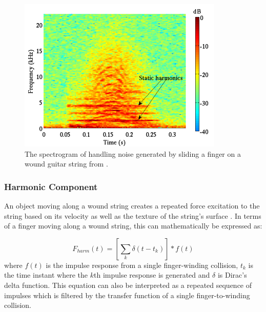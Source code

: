 \documentclass[main.tex]{subfiles}
\begin{document}
\begin{figure}[h]
    \centering
    \includegraphics[scale=1]{./images/pictures/finger-noise-spectrogram.png}
    \caption{The spectrogram of handling noise generated by sliding a finger on a wound guitar string from .}
    \label{fig:finger_noise_spectrogram}
\end{figure}

\subsubsection{Harmonic Component}
An object moving along a wound string creates a repeated force excitation to the string based on its velocity as well as the texture of the string's surface . In terms of a finger moving along a wound string, this can mathematically be expressed as:

\begin{equation}
    F_{harm}(t) = \left[\sum_k \delta(t-t_k)\right] \ast f(t)
    \label{eqn:harmonic_force}
\end{equation}
where $f(t)$ is the impulse response from a single finger-winding collision, $t_k$ is the time instant where the $k$th impulse response is generated and $\delta$ is Dirac's delta function. This equation can also be interpreted as a repeated sequence of impulses which is filtered by the transfer function of a single finger-to-winding collision.
\end{document}
